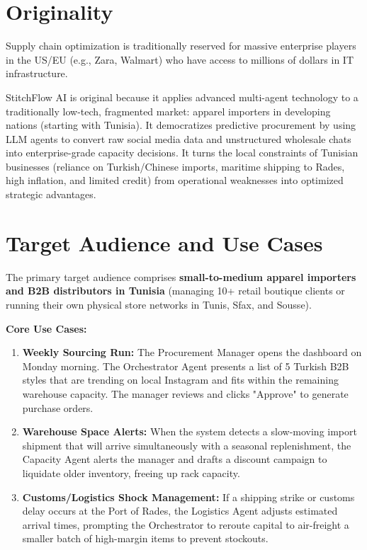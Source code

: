 \documentclass[11pt,a4paper]{article}
\begin{document}
\section{Originality}
Supply chain optimization is traditionally reserved for massive enterprise players in the US/EU (e.g., Zara, Walmart) who have access to millions of dollars in IT infrastructure. 

StitchFlow AI is original because it applies advanced multi-agent technology to a traditionally low-tech, fragmented market: apparel importers in developing nations (starting with Tunisia). It democratizes predictive procurement by using LLM agents to convert raw social media data and unstructured wholesale chats into enterprise-grade capacity decisions. It turns the local constraints of Tunisian businesses (reliance on Turkish/Chinese imports, maritime shipping to Rades, high inflation, and limited credit) from operational weaknesses into optimized strategic advantages.

\section{Target Audience and Use Cases}
The primary target audience comprises \textbf{small-to-medium apparel importers and B2B distributors in Tunisia} (managing 10+ retail boutique clients or running their own physical store networks in Tunis, Sfax, and Sousse).

\textbf{Core Use Cases:}
\begin{enumerate}
    \item \textbf{Weekly Sourcing Run:} The Procurement Manager opens the dashboard on Monday morning. The Orchestrator Agent presents a list of 5 Turkish B2B styles that are trending on local Instagram and fits within the remaining warehouse capacity. The manager reviews and clicks "Approve" to generate purchase orders.
    \item \textbf{Warehouse Space Alerts:} When the system detects a slow-moving import shipment that will arrive simultaneously with a seasonal replenishment, the Capacity Agent alerts the manager and drafts a discount campaign to liquidate older inventory, freeing up rack capacity.
    \item \textbf{Customs/Logistics Shock Management:} If a shipping strike or customs delay occurs at the Port of Rades, the Logistics Agent adjusts estimated arrival times, prompting the Orchestrator to reroute capital to air-freight a smaller batch of high-margin items to prevent stockouts.
\end{enumerate}
\end{document}
